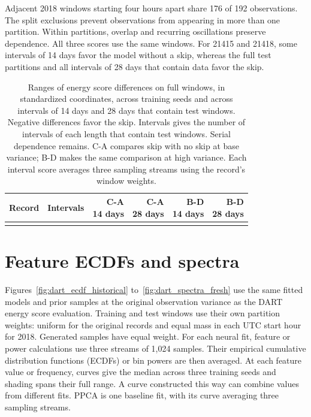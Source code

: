 \documentclass{article}
\begin{document}
Adjacent 2018 windows starting four hours apart share 176 of 192 observations. The split exclusions prevent observations from appearing in more than one partition. Within partitions, overlap and recurring oscillations preserve dependence. All three scores use the same windows. For 21415 and 21418, some intervals of 14 days favor the model without a skip, whereas the full test partitions and all intervals of 28 days that contain data favor the skip.

\begin{table}[H]
\centering
\setlength{\tabcolsep}{3pt}
\caption{Ranges of energy score differences on full windows, in standardized coordinates, across training seeds and across intervals of 14 days and 28 days that contain test windows. Negative differences favor the skip. Intervals gives the number of intervals of each length that contain test windows. Serial dependence remains. C-A compares skip with no skip at base variance; B-D makes the same comparison at high variance. Each interval score averages three sampling streams using the record's window weights.}\label{tab:dart_blocks}
\begin{tabular}{llrrrr}
\toprule
Record & Intervals & \shortstack{C-A\\14 days} & \shortstack{C-A\\28 days} & \shortstack{B-D\\14 days} & \shortstack{B-D\\28 days}\\
\midrule
\\
\bottomrule
\end{tabular}
\end{table}

\clearpage
\section{Feature ECDFs and spectra}
Figures~\ref{fig:dart_ecdf_historical} to~\ref{fig:dart_spectra_fresh} use the same fitted models and prior samples at the original observation variance as the DART energy score evaluation. Training and test windows use their own partition weights: uniform for the original records and equal mass in each UTC start hour for 2018. Generated samples have equal weight. For each neural fit, feature or power calculations use three streams of 1,024 samples. Their empirical cumulative distribution functions (ECDFs) or bin powers are then averaged. At each feature value or frequency, curves give the median across three training seeds and shading spans their full range. A curve constructed this way can combine values from different fits. PPCA is one baseline fit, with its curve averaging three sampling streams.
\end{document}
